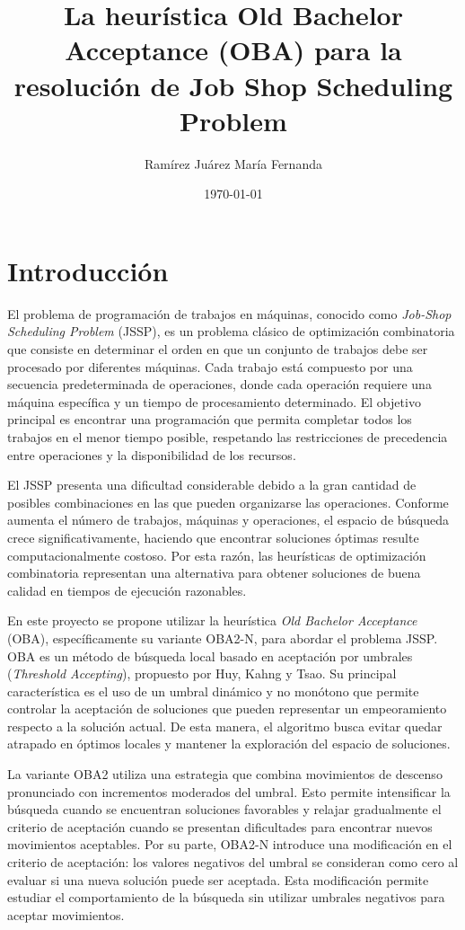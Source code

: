 \documentclass[12pt,a4paper]{article}
\title{\textbf{La heurística Old Bachelor Acceptance (OBA) para la resolución de Job Shop Scheduling Problem }}
\author{Ramírez Juárez María Fernanda}
\date{\today}
\begin{document}
\maketitle

\section{Introducción}
\label{sec:introduccion}

El problema de programación de trabajos en máquinas, conocido como \textit{Job-Shop Scheduling Problem} (JSSP), es un problema clásico de optimización combinatoria que consiste en determinar el orden en que un conjunto de trabajos debe ser procesado por diferentes máquinas. Cada trabajo está compuesto por una secuencia predeterminada de operaciones, donde cada operación requiere una máquina específica y un tiempo de procesamiento determinado. El objetivo principal es encontrar una programación que permita completar todos los trabajos en el menor tiempo posible, respetando
las restricciones de precedencia entre operaciones y la disponibilidad de los recursos.

El JSSP presenta una dificultad considerable debido a la gran cantidad de posibles combinaciones en las que pueden organizarse las operaciones. Conforme aumenta el número de trabajos, máquinas y operaciones, el espacio de búsqueda crece significativamente, haciendo que encontrar soluciones óptimas resulte computacionalmente costoso. Por esta razón, las heurísticas de optimización combinatoria representan una alternativa para obtener soluciones de buena calidad en tiempos de ejecución razonables.

En este proyecto se propone utilizar la heurística \textit{Old Bachelor Acceptance} (OBA), específicamente su variante OBA2-N, para abordar el problema JSSP. OBA es un método de búsqueda local basado en aceptación por umbrales (\textit{Threshold Accepting}), propuesto por Huy, Kahng y Tsao. Su principal característica es el uso de un umbral dinámico y no monótono que permite controlar la aceptación de soluciones que pueden representar un empeoramiento respecto a la solución actual. De esta manera, el algoritmo busca evitar quedar atrapado en óptimos locales y mantener la exploración del espacio de soluciones.

La variante OBA2 utiliza una estrategia que combina movimientos de descenso pronunciado con incrementos moderados del umbral. Esto permite intensificar la búsqueda cuando se encuentran soluciones favorables y relajar gradualmente el criterio de aceptación cuando se presentan dificultades para encontrar nuevos movimientos aceptables. Por su parte, OBA2-N introduce una modificación en el criterio de aceptación: los valores negativos
del umbral se consideran como cero al evaluar si una nueva solución puede ser aceptada. Esta modificación permite estudiar el comportamiento de la búsqueda sin utilizar umbrales negativos para aceptar movimientos.
\end{document}
